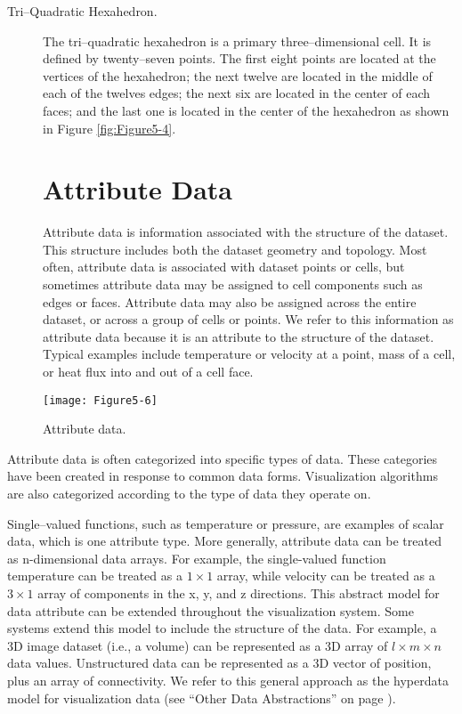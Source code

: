 \begin{description}
\item[Tri--Quadratic Hexahedron.] The tri--quadratic hexahedron is a primary three--dimensional cell. It is defined by twenty--seven points. The first eight points are located at the vertices of the hexahedron; the next twelve are located in the middle of each of the twelves edges; the next six are located in the center of each faces; and the last one is located in the center of the hexahedron as shown in Figure \ref{fig:Figure5-4}.

\section{Attribute Data}

Attribute data is information associated with the structure of the dataset. This structure includes both the dataset geometry and topology. Most often, attribute data is associated with dataset points or cells, but sometimes attribute data may be assigned to cell components such as edges or faces. Attribute data may also be assigned across the entire dataset, or across a group of cells or points. We refer to this information as attribute data because it is an attribute to the structure of the dataset. Typical examples include temperature or velocity at a point, mass of a cell, or heat flux into and out of a cell face.

\end{description}
\begin{figure}[!htb]
	\centering
	\texttt{[image: Figure5-6]}
	\caption{Attribute data.}
	\label{fig:Figure5-6}
\end{figure}

Attribute data is often categorized into specific types of data. These categories have been created in response to common data forms. Visualization algorithms are also categorized according to the type of data they operate on.

Single--valued functions, such as temperature or pressure, are examples of scalar data, which is one attribute type. More generally, attribute data can be treated as n-dimensional data arrays. For example, the single-valued function temperature can be treated as a $1 \times 1$ array, while velocity can be treated as a $3 \times 1$ array of components in the x, y, and z directions. This abstract model for data attribute can be extended throughout the visualization system. Some systems extend this model to include the structure of the data. For example, a 3D image dataset (i.e., a volume) can be represented as a 3D array of $l \times m \times n$ data values. Unstructured data can be represented as a 3D vector of position, plus an array of connectivity. We refer to this general approach as the hyperdata model for visualization data (see ``Other Data Abstractions'' on page \pageref{sec:other_data_abstractions}).

